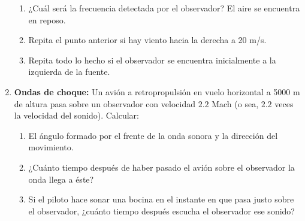 \documentclass[11pt,spanish]{article}
\begin{document}
\begin{enumerate}
	\begin{enumerate}
		\item ¿Cuál será la frecuencia detectada por el observador? El aire se encuentra
		en reposo.
		\item Repita el punto anterior si hay viento hacia la derecha a 20 m/s.
		\item Repita todo lo hecho si el observador se encuentra inicialmente a
		la izquierda de la fuente.
	\end{enumerate}


	\item \textbf{Ondas de choque:} Un avión a retropropulsión en vuelo horizontal
	a 5000 m de altura pasa sobre un observador con velocidad $2.2$ Mach
	(o sea, $2.2$ veces la velocidad del sonido). Calcular:

	\begin{enumerate}
		\item El ángulo formado por el frente de la onda sonora y la dirección del
		movimiento.
		\item ¿Cuánto tiempo después de haber pasado el avión sobre el observador
		la onda llega a éste?
		\item Si el piloto hace sonar una bocina en el instante en que pasa justo
		sobre el observador, ¿cuánto tiempo después escucha el observador
		ese sonido?
	\end{enumerate}

\end{enumerate}
\end{document}
